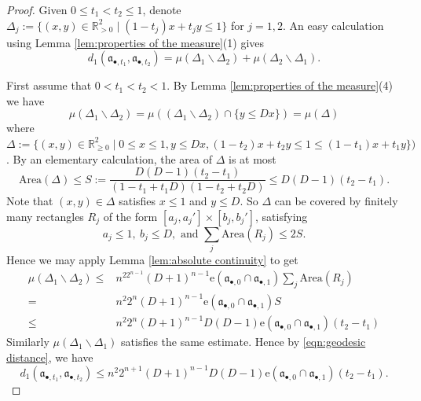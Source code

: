 \documentclass[11pt, leqno]{amsart}%
\theoremstyle{plain}
\theoremstyle{definition}
\theoremstyle{remark}
\newcommand{\bR}{\mathbb{R}}
\newcommand{\fa}{\mathfrak{a}}
\newcommand{\e}{\mathrm{e}}
\numberwithin{equation}{section}
\begin{document}
\begin{proof}
    Given $0\le t_1<t_2\le 1$, denote $\Delta_j:=\{(x,y)\in\bR^2_{>0}\mid (1-t_j)x+t_jy\le 1\}$ for $j=1,2$. An easy calculation using Lemma \ref{lem:properties of the measure}(1) gives
    \begin{equation}\label{eqn:geodesic distance}
        d_1(\fa_{\bullet,t_1},\fa_{\bullet,t_2})=
        \mu(\Delta_1\backslash\Delta_2)+
        \mu(\Delta_2\backslash\Delta_1).
    \end{equation}
	
    First assume that $0<t_1<t_2<1$. By Lemma \ref{lem:properties of the measure}(4) we have
    \[
        \mu(\Delta_1\backslash\Delta_2)
        =\mu((\Delta_1\backslash\Delta_2)\cap\{y\le Dx\})=\mu(\Delta)
    \]
    where $\Delta:=\{(x,y)\in\bR^2_{\ge 0}\mid 0\le x\le 1,y\le Dx, (1-t_2)x+t_2y\le 1\le (1-t_1)x+t_1y\})$. By an elementary calculation, the area of $\Delta$ is at most
    \[
        \mathrm{Area}(\Delta)\le S:=\frac{D(D-1)(t_2-t_1)}{(1-t_1+t_1D)(1-t_2+t_2D)}\le D(D-1)(t_2-t_1).
    \]
    Note that $(x,y)\in\Delta$ satisfies $x\le 1$ and $y\le D$. So $\Delta$ can be covered by finitely many rectangles $R_j$ of the form $[a_j,a_j']\times [b_j,b_j']$, satisfying 
    \[
        a_j\le 1,\ b_j\le D, \text{ and } \sum_j \mathrm{Area}(R_j)\le 2S.
    \]
    Hence we may apply Lemma \ref{lem:absolute continuity} to get
    \begin{align*}
        \mu(\Delta_1\backslash\Delta_2)
        \le &n^22^{n-1}(D+1)^{n-1}\e(\fa_{\bullet,0}\cap\fa_{\bullet,1})\sum_j \mathrm{Area}(R_j)\\
        =&n^2 2^n(D+1)^{n-1}\e(\fa_{\bullet,0}\cap\fa_{\bullet,1})S\\
        \le&n^2 2^n(D+1)^{n-1}D(D-1)\e(\fa_{\bullet,0}\cap\fa_{\bullet,1})(t_2-t_1)
    \end{align*}
    Similarly $\mu(\Delta_1\backslash\Delta_1)$ satisfies the same estimate. Hence by \eqref{eqn:geodesic distance}, we have
    \begin{equation}\label{eqn:Lip mid}
        d_1(\fa_{\bullet,t_1},\fa_{\bullet,t_2})\le n^2 2^{n+1}(D+1)^{n-1}D(D-1)\e(\fa_{\bullet,0}\cap\fa_{\bullet,1})(t_2-t_1).
    \end{equation}
	

\end{proof}
\end{document}
